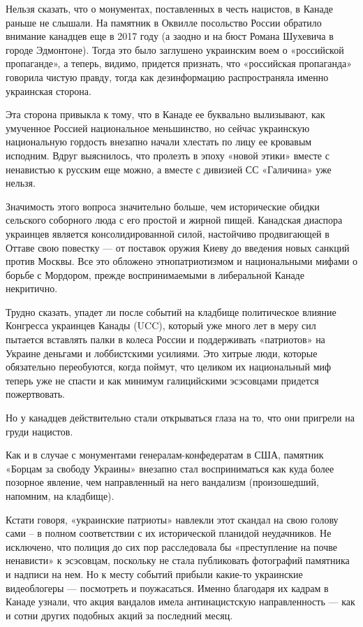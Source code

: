 \documentclass[a4paper,11pt]{extreport}
\begin{document}
Нельзя сказать, что о монументах, поставленных в честь нацистов, в Канаде
раньше не слышали. На памятник в Оквилле посольство России обратило внимание
канадцев еще в 2017 году (а заодно и на бюст Романа Шухевича в городе
Эдмонтоне). Тогда это было заглушено украинским воем о «российской пропаганде»,
а теперь, видимо, придется признать, что «российская пропаганда» говорила
чистую правду, тогда как дезинформацию распространяла именно украинская
сторона.

Эта сторона привыкла к тому, что в Канаде ее буквально вылизывают, как
умученное Россией национальное меньшинство, но сейчас украинскую национальную
гордость внезапно начали хлестать по лицу ее кровавым исподним. Вдруг
выяснилось, что пролезть в эпоху «новой этики» вместе с ненавистью к русским
еще можно, а вместе с дивизией СС «Галичина» уже нельзя.

Значимость этого вопроса значительно больше, чем исторические обидки сельского
соборного люда с его простой и жирной пищей. Канадская диаспора украинцев
является консолидированной силой, настойчиво продвигающей в Оттаве свою
повестку --- от поставок оружия Киеву до введения новых санкций против Москвы.
Все это обложено этнопатриотизмом и национальными мифами о борьбе с Мордором,
прежде воспринимаемыми в либеральной Канаде некритично. 

Трудно сказать, упадет ли после событий на кладбище политическое влияние
Конгресса украинцев Канады (UCC), который уже много лет в меру сил пытается
вставлять палки в колеса России и поддерживать «патриотов» на Украине деньгами
и лоббистскими усилиями. Это хитрые люди, которые обязательно переобуются,
когда поймут, что целиком их национальный миф теперь уже не спасти и как
минимум галицийскими эсэсовцами придется пожертвовать.

Но у канадцев действительно стали открываться глаза на то, что они пригрели на
груди нацистов.

Как и в случае с монументами генералам-конфедератам в США, памятник «Борцам за
свободу Украины» внезапно стал восприниматься как куда более позорное явление,
чем направленный на него вандализм (произошедший, напомним, на кладбище).

Кстати говоря, «украинские патриоты» навлекли этот скандал на свою голову сами
– в полном соответствии с их исторической планидой неудачников. Не исключено,
что полиция до сих пор расследовала бы «преступление на почве ненависти» к
эсэсовцам, поскольку не стала публиковать фотографий памятника и надписи на
нем. Но к месту событий прибыли какие-то украинские видеоблогеры --- посмотреть и
поужасаться. Именно благодаря их кадрам в Канаде узнали, что акция вандалов
имела антинацистскую направленность --- как и сотни других подобных акций за
последний месяц.
\end{document}
